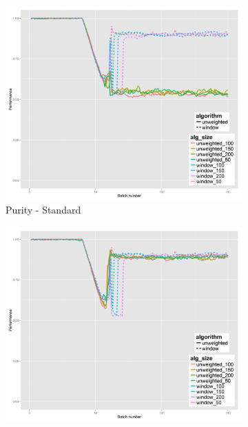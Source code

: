 \begin{figure}[h]
        \centering
        \begin{subfigure}[b]{0.47\textwidth}
          \includegraphics[width=\textwidth]{standard_alt/ci_evolving_pen_34_37_standard_purity.png}         
                 \caption{Purity - Standard}
                 \label{fig:ps_3437}
        \end{subfigure}
        \begin{subfigure}[b]{0.47\textwidth}
                 \includegraphics[width=\textwidth]{standard_alt/ci_evolving_pen_34_37_alternative_purity.png}

\end{subfigure}
\end{figure}
